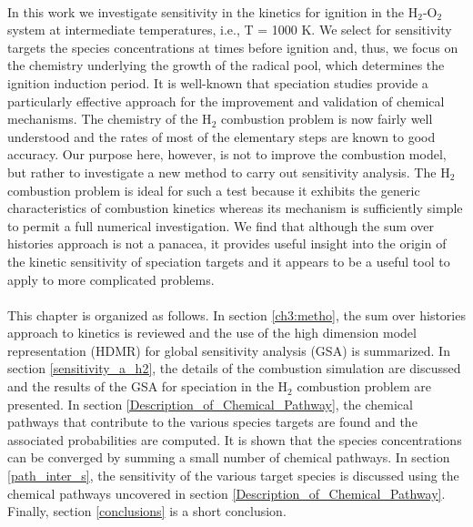 \paragraph{}
In this work we investigate sensitivity in the kinetics for
ignition in the H$_2$-O$_2$ system at intermediate temperatures, i.e.,
T = 1000 K. We select for sensitivity targets the species
concentrations at times before ignition and, thus, we focus on
the chemistry underlying the growth of the radical pool, which
determines the ignition induction period. It is well-known that
speciation studies provide a particularly effective approach for
the improvement and validation of chemical mechanisms.\cite{ch3_18_karwat2011chemical}
The chemistry of the H$_2$ combustion problem is now fairly well
understood and the rates of most of the elementary steps are
known to good accuracy.\cite{ch1_IRPC_52_konnov2008remaining,ch1_IRPC_53_hashemi2015hydrogen} Our purpose here, however, is not
to improve the combustion model, but rather to investigate a
new method to carry out sensitivity analysis. The H$_2$ combustion problem is ideal for such a test because it exhibits
the generic characteristics of combustion kinetics whereas its
mechanism is sufficiently simple to permit a full numerical
investigation. We find that although the sum over histories
approach is not a panacea, it provides useful insight into the
origin of the kinetic sensitivity of speciation targets and it
appears to be a useful tool to apply to more complicated
problems.
\newline
\paragraph{}
This chapter is organized as follows. In section \ref{ch3:metho}, the sum over
histories approach to kinetics is reviewed and the use of the
high dimension model representation (HDMR) for global
sensitivity analysis (GSA) is summarized. In section \ref{sensitivity_a_h2}, the
details of the combustion simulation are discussed and the
results of the GSA for speciation in the H$_2$ combustion problem
are presented. In section \ref{Description_of_Chemical_Pathway}, the chemical pathways that
contribute to the various species targets are found and the
associated probabilities are computed. It is shown that the
species concentrations can be converged by summing a small
number of chemical pathways. In section \ref{path_inter_s}, the sensitivity of
the various target species is discussed using the chemical
pathways uncovered in section \ref{Description_of_Chemical_Pathway}. Finally, section \ref{conclusions} is a short
conclusion.
